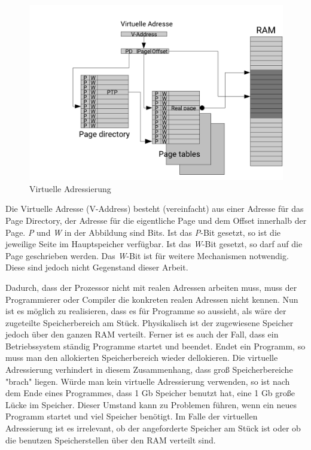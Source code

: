 \begin{figure}
\includegraphics[scale=0.3]{bilder/mmu} 
\caption[Virtuelle Adressierung]{Virtuelle Adressierung \cite{richter}}
\label{MMU}
\end{figure}

Die Virtuelle Adresse (V-Address) besteht (vereinfacht) aus einer Adresse für das Page Directory, der Adresse für die eigentliche Page und dem Offset innerhalb der Page. \textit{P} und \textit{W} in der Abbildung sind Bits. Ist das \textit{P}-Bit gesetzt, so ist die jeweilige Seite im Hauptspeicher verfügbar. Ist das \textit{W}-Bit gesetzt, so darf auf die Page geschrieben werden. Das \textit{W}-Bit ist für weitere Mechanismen notwendig. Diese sind jedoch nicht Gegenstand dieser Arbeit.  

Dadurch, dass der Prozessor nicht mit realen Adressen arbeiten muss, muss der Programmierer oder Compiler die konkreten realen Adressen nicht kennen. Nun ist es möglich zu realisieren, dass es für Programme so aussieht, als wäre der zugeteilte Speicherbereich am Stück. Physikalisch ist der zugewiesene Speicher jedoch über den ganzen RAM verteilt. Ferner ist es auch der Fall, dass ein Betriebssystem ständig Programme startet und beendet. Endet ein Programm, so muss man den allokierten   Speicherbereich wieder dellokieren. Die virtuelle Adressierung verhindert in diesem Zusammenhang, dass groß Speicherbereiche "brach" liegen. Würde man kein virtuelle Adressierung verwenden, so ist nach dem Ende eines Programmes, dass 1 Gb Speicher benutzt hat, eine 1 Gb große Lücke im Speicher. Dieser Umstand kann zu Problemen führen, wenn ein neues Programm startet und viel Speicher benötigt. Im Falle der virtuellen Adressierung ist es irrelevant, ob der angeforderte Speicher am Stück ist oder ob die benutzen Speicherstellen über den RAM verteilt sind.    

